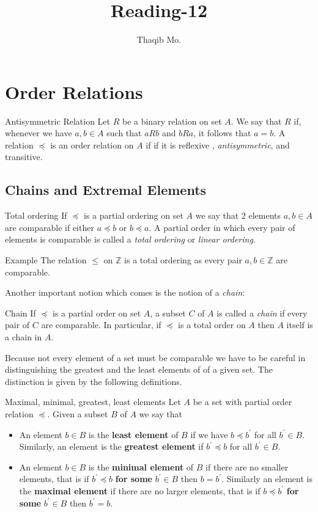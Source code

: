 \documentclass[16pt,a4paper]{article}
\author{Thaqib Mo.}
\title{ Reading-12 }
\theoremstyle{definition}
\newcommand{\ord}{\preceq}
\begin{document}
\maketitle
\newpage
\section{Order Relations}
\begin{defn}{Antisymmetric Relation}{}
Let $R$ be a binary relation on set $A$. We say that $R$ if, whenever we have $a,b \in A$ such that $aRb$ and $bRa$, it follows that $a=b$. A relation $\ord$ is an order relation on $A$ if if it is reflexive , \textit{antisymmetric}, and transitive.
\end{defn}
\subsection{Chains and Extremal Elements}
\begin{defn}{Total ordering}{}
If $\ord$ is a partial ordering on set $A$ we say that 2 elements $a,b \in A$ are comparable if either $a\ord b$ or $b \ord a$. A partial order in which every pair of elements is comparable is called a \textit{total ordering} or \textit{linear ordering}. \\
\end{defn}
{\color{red} Example} The relation $\leq$ on $\mathbb{Z}$ is a total ordering as every pair $a,b \in \mathbb{Z}$ are comparable. 

Another important notion which comes is the notion of a \textit{chain}:
\begin{defn}{Chain}{}
If $\ord$ is a partial order on set $A$, a subset $C$ of $A$ is called a \textit{chain} if every pair of $C$ are comparable. In particular, if $\ord$ is a total order on $A$ then $A$ itself is a chain in $A$. 
\end{defn}

Because not every element of a set must be comparable we have to be careful in distinguishing the greatest and the least elements of of a given set. The distinction is given by the following definitions. 
\begin{defn}{Maximal, minimal, greatest, least elements}{}
Let $A$ be a set with partial order relation $\ord$. Given a subset $B$ of $A$ we say that 
\begin{itemize}
\item An element $b\in B$ is the \textbf{least element} of $B$ if we have $b\ord b^\prime$ for all $b^\prime \in B$. Similarly, an element is the \textbf{greatest element} if $b^\prime \ord b$ for all $b^\prime\in B$. 

\item An element $b\in B$ is the \textbf{minimal element} of $B$ if there are no smaller elements, that is if $b^\prime \ord b$ \textbf{for some} $b^\prime \in B$ then $b = b^\prime$. Similarly an element is the \textbf{maximal element} if there are no larger elements, that is if $b \ord b^\prime$ \textbf{for some} $b^\prime \in B$ then $b^\prime = b$. 
\end{itemize}
\end{defn}
\end{document}
